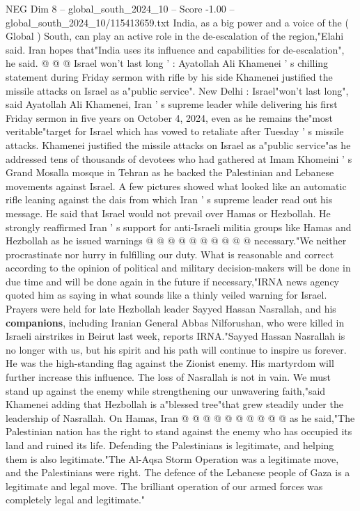 \begin{textsample}{NEG Dim 8 – global\_south\_2024\_10 – Score -1.00 – global\_south\_2024\_10/115413659.txt}
India, as a big power and a voice of the ( Global ) South, can play an active role in the de-escalation of the region,"Elahi said.
Iran hopes that"India uses its influence and capabilities for de-escalation", he said. @ @ @ Israel won't last long ' : Ayatollah Ali Khamenei ' s chilling statement during Friday sermon with rifle by his side Khamenei justified the missile attacks on Israel as a"public service".
New Delhi : Israel"won't last long", said Ayatollah Ali Khamenei, Iran ' s supreme leader while delivering his first Friday sermon in five years on October 4, 2024, even as he remains the"most veritable"target for Israel which has vowed to retaliate after Tuesday ' s missile attacks.
Khamenei justified the missile attacks on Israel as a"public service"as he addressed tens of thousands of devotees who had gathered at Imam Khomeini ' s Grand Mosalla mosque in Tehran as he backed the Palestinian and Lebanese movements against Israel.
A few pictures showed what looked like an automatic rifle leaning against the dais from which Iran ' s supreme leader read out his message.
He said that Israel would not prevail over Hamas or Hezbollah.
He strongly reaffirmed Iran ' s support for anti-Israeli militia groups like Hamas and Hezbollah as he issued warnings @ @ @ @ @ @ @ @ @ @ necessary."We neither procrastinate nor hurry in fulfilling our duty.
What is reasonable and correct according to the opinion of political and military decision-makers will be done in due time and will be done again in the future if necessary,"IRNA news agency quoted him as saying in what sounds like a thinly veiled warning for Israel.
Prayers were held for late Hezbollah leader Sayyed Hassan Nasrallah, and his \textbf{companions}, including Iranian General Abbas Nilforushan, who were killed in Israeli airstrikes in Beirut last week, reports IRNA."Sayyed Hassan Nasrallah is no longer with us, but his spirit and his path will continue to inspire us forever.
He was the high-standing flag against the Zionist enemy.
His martyrdom will further increase this influence.
The loss of Nasrallah is not in vain.
We must stand up against the enemy while strengthening our unwavering faith,"said Khamenei adding that Hezbollah is a"blessed tree"that grew steadily under the leadership of Nasrallah.
On Hamas, Iran @ @ @ @ @ @ @ @ @ @ as he said,"The Palestinian nation has the right to stand against the enemy who has occupied its land and ruined its life.
Defending the Palestinians is legitimate, and helping them is also legitimate."The Al-Aqsa Storm Operation was a legitimate move, and the Palestinians were right.
The defence of the Lebanese people of Gaza is a legitimate and legal move.
The brilliant operation of our armed forces was completely legal and legitimate."

\end{textsample}
